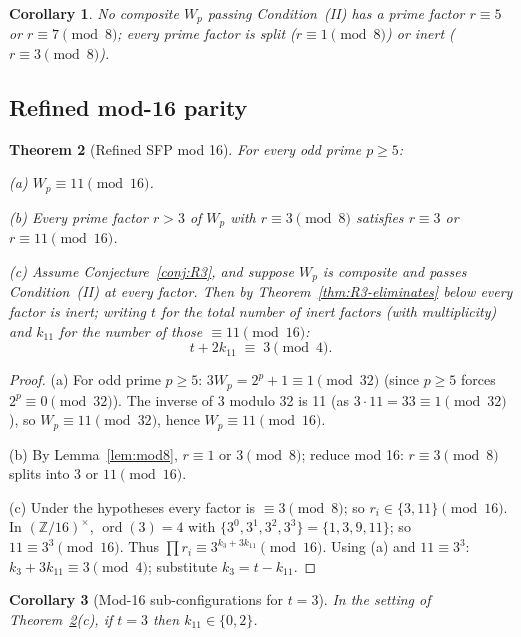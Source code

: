 \documentclass[11pt]{amsart}
\theoremstyle{plain}
\newtheorem{theorem}{Theorem}[section]
\newtheorem{corollary}[theorem]{Corollary}
\theoremstyle{definition}
\theoremstyle{remark}
\numberwithin{equation}{section}
\newcommand{\ord}{\operatorname{ord}}
\newcommand{\Z}{\mathbb{Z}}
\begin{document}
\begin{corollary}\label{cor:no57}
No composite $W_p$ passing Condition~(II) has a prime factor $r \equiv 5$ or $r \equiv 7 \pmod 8$; every prime factor is split ($r \equiv 1 \pmod 8$) or inert ($r \equiv 3 \pmod 8$).
\end{corollary}

\subsection{Refined mod-16 parity}

\begin{theorem}[Refined SFP mod 16]\label{thm:mod16}
For every odd prime $p \geq 5$:

(a) $W_p \equiv 11 \pmod{16}$.

(b) Every prime factor $r > 3$ of $W_p$ with $r \equiv 3 \pmod 8$ satisfies $r \equiv 3$ or $r \equiv 11 \pmod{16}$.

(c) Assume Conjecture~\ref{conj:R3}, and suppose $W_p$ is composite and passes Condition~(II) at every factor. Then by Theorem~\ref{thm:R3-eliminates} below every factor is inert; writing $t$ for the total number of inert factors (with multiplicity) and $k_{11}$ for the number of those $\equiv 11 \pmod{16}$:
\[
  t + 2 k_{11} \;\equiv\; 3 \pmod 4.
\]
\end{theorem}

\begin{proof}
(a) For odd prime $p \geq 5$: $3 W_p = 2^p + 1 \equiv 1 \pmod{32}$ (since $p \geq 5$ forces $2^p \equiv 0 \pmod{32}$). The inverse of 3 modulo 32 is 11 (as $3 \cdot 11 = 33 \equiv 1 \pmod{32}$), so $W_p \equiv 11 \pmod{32}$, hence $W_p \equiv 11 \pmod{16}$.

(b) By Lemma~\ref{lem:mod8}, $r \equiv 1$ or $3 \pmod 8$; reduce mod 16: $r \equiv 3 \pmod 8$ splits into $3$ or $11 \pmod{16}$.

(c) Under the hypotheses every factor is $\equiv 3 \pmod 8$; so $r_i \in \{3, 11\} \pmod{16}$. In $(\Z/16)^\times$, $\ord(3) = 4$ with $\{3^0, 3^1, 3^2, 3^3\} = \{1, 3, 9, 11\}$; so $11 \equiv 3^3 \pmod{16}$. Thus $\prod r_i \equiv 3^{k_3 + 3 k_{11}} \pmod{16}$. Using (a) and $11 \equiv 3^3$: $k_3 + 3 k_{11} \equiv 3 \pmod 4$; substitute $k_3 = t - k_{11}$.
\end{proof}

\begin{corollary}[Mod-16 sub-configurations for $t = 3$]\label{cor:mod16-t3}
In the setting of Theorem~\ref{thm:mod16}(c), if $t = 3$ then $k_{11} \in \{0, 2\}$.
\end{corollary}
\end{document}
